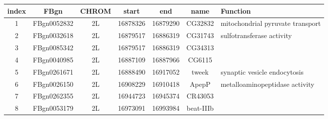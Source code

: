 \centering \begin{tabular}{c|c|c|c|c|c | p{2in}}
index	&FBgn	&CHROM	&start	&end	&name & Function\\\hline
1	&FBgn0052832	&2L	&16878326	&16879290	&CG32832& mitochondrial 
pyruvate transport \\
2	&FBgn0032618	&2L	&16879517	&16886319	&CG31743 & sulfotransferase 
activity\\
3	&FBgn0085342	&2L	&16879517	&16886319	&CG34313&\\
4	&FBgn0040985	&2L	&16887109	&16887966	&CG6115 &\\
5	&FBgn0261671	&2L	&16888490	&16917052	&tweek&  synaptic vesicle 
endocytosis\\
6	&FBgn0026150	&2L	&16908229	&16910418	&ApepP& metalloaminopeptidase 
activity\\
7	&FBgn0262355	&2L	&16944723	&16945374	&CR43053&\\
8	&FBgn0053179	&2L	&16973091	&16993984	&beat-IIIb&
\end{tabular}
